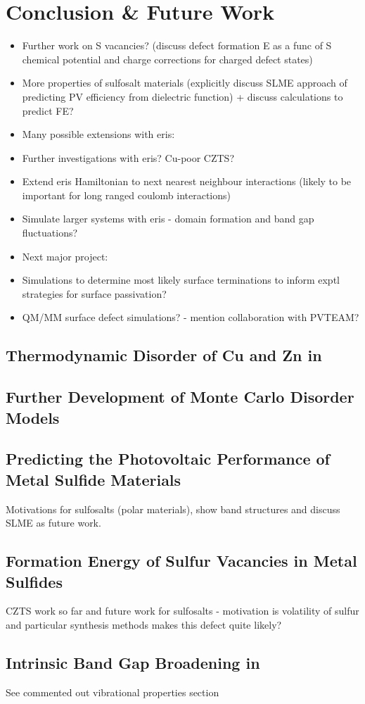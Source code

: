 
\chapter{Conclusion \& Future Work}
\label{ch:conclusions}

\begin{itemize}
\item Further work on S vacancies? (discuss defect formation E as a func of S chemical potential and charge corrections for charged defect states)
\item More properties of sulfosalt materials (explicitly discuss SLME approach of predicting PV efficiency from dielectric function) + discuss calculations to predict FE?
\item Many possible extensions with eris:
\item Further investigations with eris? Cu-poor CZTS?
\item Extend eris Hamiltonian to next nearest neighbour interactions (likely to be important for long ranged coulomb interactions)
\item Simulate larger systems with eris - domain formation and band gap fluctuations?
\item Next major project:
\item Simulations to determine most likely surface terminations to inform exptl strategies for surface passivation?
\item QM/MM surface defect simulations? - mention collaboration with PVTEAM?
\end{itemize}


\section{Thermodynamic Disorder of Cu and Zn in {\CZTS}}

\section{Further Development of Monte Carlo Disorder Models}

\section{Predicting the Photovoltaic Performance of Metal Sulfide Materials}
Motivations for sulfosalts (polar materials), show band structures and discuss SLME as future work.

\section{Formation Energy of Sulfur Vacancies in Metal Sulfides}
CZTS work so far and future work for sulfosalts - motivation is volatility of sulfur and particular synthesis methods makes this defect quite likely?

\section{Intrinsic Band Gap Broadening in {\CZTS}}
See commented out vibrational properties section



 